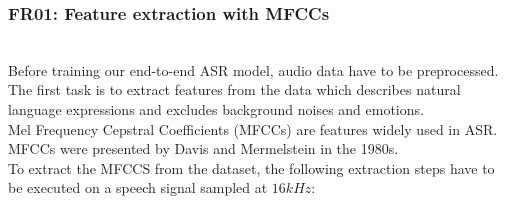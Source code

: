 
\subsubsection{FR01: Feature extraction with MFCCs}\label{mfccs}~\\


Before training our end-to-end ASR model, audio data have to be preprocessed.
The first task is to extract features from the data which describes natural
language expressions and excludes background noises and emotions.\\


Mel Frequency Cepstral Coefficients (MFCCs) are features widely used in ASR.
MFCCs were presented by Davis and Mermelstein in the 1980s.~\cite{mfcc}\\

To extract the MFCCS from the dataset, the following extraction steps have to be
executed on a speech signal sampled at $16kHz$:\\

